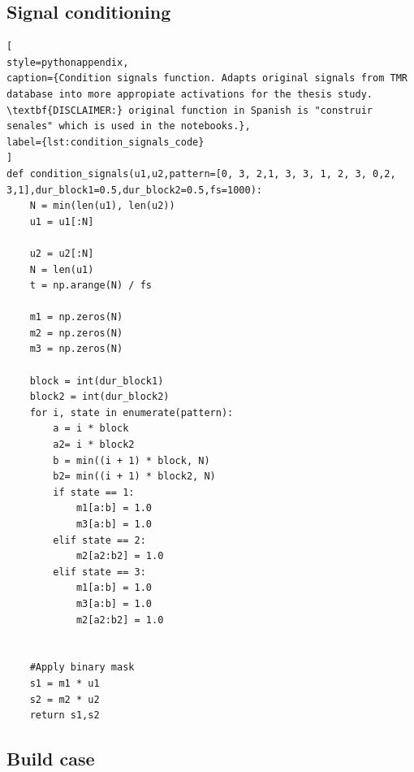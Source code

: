 \subsection{Signal conditioning}
\label{app:signal_coditioning}
\begin{lstlisting}[
style=pythonappendix,
caption={Condition signals function. Adapts original signals from TMR database into more appropiate activations for the thesis study. \textbf{DISCLAIMER:} original function in Spanish is "construir senales" which is used in the notebooks.},
label={lst:condition_signals_code}
]
def condition_signals(u1,u2,pattern=[0, 3, 2,1, 3, 3, 1, 2, 3, 0,2, 3,1],dur_block1=0.5,dur_block2=0.5,fs=1000):
    N = min(len(u1), len(u2))
    u1 = u1[:N]

    u2 = u2[:N]
    N = len(u1)
    t = np.arange(N) / fs

    m1 = np.zeros(N)
    m2 = np.zeros(N)
    m3 = np.zeros(N)
    
    block = int(dur_block1)
    block2 = int(dur_block2)
    for i, state in enumerate(pattern):
        a = i * block
        a2= i * block2
        b = min((i + 1) * block, N)
        b2= min((i + 1) * block2, N)
        if state == 1:
            m1[a:b] = 1.0
            m3[a:b] = 1.0
        elif state == 2:
            m2[a2:b2] = 1.0
        elif state == 3:
            m1[a:b] = 1.0
            m3[a:b] = 1.0
            m2[a2:b2] = 1.0


    #Apply binary mask
    s1 = m1 * u1
    s2 = m2 * u2
    return s1,s2
\end{lstlisting}
%

\clearpage
\subsection{Build case}

